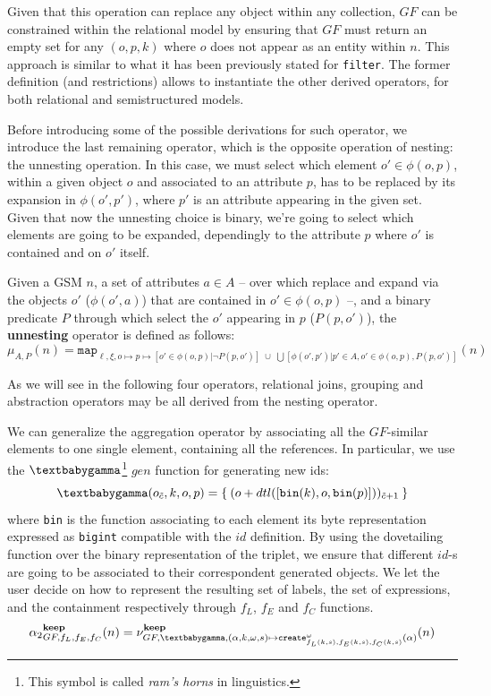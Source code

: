 Given that this operation can replace any object within any collection, $GF$ can be constrained within the relational model by ensuring that $GF$ must return an empty set for any $(o,p,k)$ where $o$ does not appear as an entity within $n$. This approach is similar to what it has been previously stated for \texttt{filter}. The former definition (and restrictions) allows to instantiate the other derived operators, for both relational and semistructured models. 


Before introducing some of the possible derivations for such operator, we  introduce the last remaining operator, which is the opposite operation of nesting: the unnesting operation. In this case, we must select which element $o'\in\phi(o,p)$, within a given object $o$ and associated to an attribute $p$, has to be replaced by its expansion in $\phi(o',p')$, where $p'$ is an attribute appearing in the given set. Given that now the unnesting choice is binary, we're going to select which elements are going to be expanded, dependingly to the attribute $p$ where $o'$ is contained and on $o'$ itself.

\begin{definition}[Unnesting]
	Given a GSM $n$, a set of attributes $a\in A$ -- over which replace and expand via the objects $o'$ ($\phi(o',a)$) that are contained in $o'\in\phi(o,p)$ --, and a binary predicate $P$ through which select the $o'$ appearing in $p$ ($P(p,o')$), the \textbf{unnesting}  operator is defined as follows:
	\[\mu_{A,P}(n)=\texttt{map}_{\ell,\xi,o\mapsto p\mapsto [o'\in\phi(o,p)|\neg P(p,o')]\;\cup\;\bigcup[\phi(o',p')|p'\in A, o'\in\phi(o,p), P(p,o')]}(n)\]
\end{definition}

As we will see in the following four operators, relational joins, grouping and abstraction operators may be all derived from the nesting operator.

We can generalize the aggregation operator by associating all the $GF$-similar elements to one single element, containing all the references. In particular, we use the $\genp$\footnote{This symbol is called \textit{ram's horns} in linguistics.} $gen$ function for generating new ids:
\[\genp(o_{\tilde{c}},k,o,p)=\Set{(o+dtl([\texttt{bin}(k),o,\texttt{bin}(p)]))_{\tilde{c}+1}}\] where \texttt{bin} is the function associating to each element its byte representation expressed as \texttt{bigint} compatible with the $id$ definition. By using the dovetailing function over the binary representation of the triplet, we ensure that different $id$-s are going to be associated to their correspondent generated objects.
We let the user decide on how to represent the resulting set of labels, the set of expressions, and the containment respectively through $f_L$, $f_E$ and $f_C$ functions. 
\[{\alpha_2}_{GF,f_L,f_E,f_C}^{\textbf{keep}}(n)=\nu^{\textbf{keep}}_{GF,\genp,(\alpha,k,\omega,s)\mapsto \texttt{create}^\omega_{f_L(k,s),f_E(k,s),f_C(k, s)}(\alpha)}(n)\]



